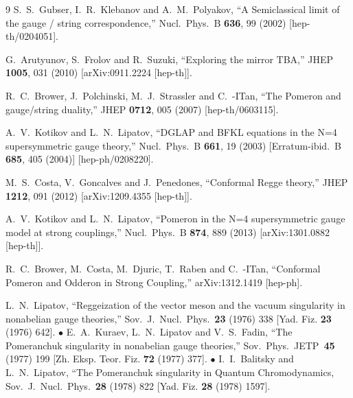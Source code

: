 \documentclass[a4paper,11pt]{article}
\numberwithin{equation}{section}
\begin{document}
\begin{thebibliography} {9}
  S.~S.~Gubser, I.~R.~Klebanov and A.~M.~Polyakov,
  ``A Semiclassical limit of the gauge / string correspondence,''
  Nucl.\ Phys.\ B {\bf 636}, 99 (2002)
  [hep-th/0204051].

  G.~Arutyunov, S.~Frolov and R.~Suzuki,
  ``Exploring the mirror TBA,''
  JHEP {\bf 1005}, 031 (2010)
  [arXiv:0911.2224 [hep-th]].

  R.~C.~Brower, J.~Polchinski, M.~J.~Strassler and C.~-ITan,
  ``The Pomeron and gauge/string duality,''
  JHEP {\bf 0712}, 005 (2007)
  [hep-th/0603115].

  A.~V.~Kotikov and L.~N.~Lipatov,
  ``DGLAP and BFKL equations in the N=4 supersymmetric gauge theory,''
  Nucl.\ Phys.\ B {\bf 661}, 19 (2003)
  [Erratum-ibid.\ B {\bf 685}, 405 (2004)]
  [hep-ph/0208220].

  M.~S.~Costa, V.~Goncalves and J.~Penedones,
  ``Conformal Regge theory,''
  JHEP {\bf 1212}, 091 (2012)
  [arXiv:1209.4355 [hep-th]].

  A.~V.~Kotikov and L.~N.~Lipatov,
  ``Pomeron in the N=4 supersymmetric gauge model at strong couplings,''
  Nucl.\ Phys.\ B {\bf 874}, 889 (2013)
  [arXiv:1301.0882 [hep-th]].

  R.~C.~Brower, M.~Costa, M.~Djuric, T.~Raben and C.~-ITan,
  ``Conformal Pomeron and Odderon in Strong Coupling,''
  arXiv:1312.1419 [hep-ph].

  L.~N.~Lipatov, ``Reggeization of the vector meson and the vacuum singularity in nonabelian gauge theories,'' Sov.\ J.\ Nucl.\ Phys.\ {\bf 23} (1976) 338 [Yad. Fiz. {\bf 23} (1976) 642]. $\bullet$
  E.~A.~Kuraev, L.~N.~Lipatov and V.~S.~Fadin, ``The Pomeranchuk singularity in nonabelian gauge theories,'' Sov.\ Phys.\ JETP\ {\bf 45} (1977) 199 [Zh. Eksp. Teor. Fiz. {\bf 72} (1977) 377]. $\bullet$
  I.~I.~Balitsky and L.~N.~Lipatov, ``The Pomeranchuk singularity in Quantum Chromodynamics,\\ Sov.\ J.\ Nucl.\ Phys.\ {\bf 28} (1978) 822 [Yad. Fiz. {\bf 28} (1978) 1597].


\end{thebibliography}
\end{document}
